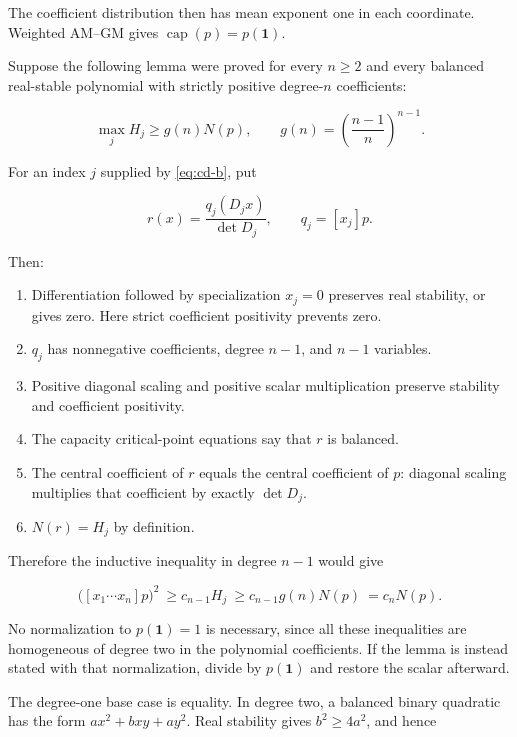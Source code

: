 \documentclass[11pt,a4paper]{article}
\providecommand{\tightlist}{\setlength{\itemsep}{0pt}\setlength{\parskip}{0pt}}
\theoremstyle{definition}
\theoremstyle{remark}
\begin{document}
The coefficient distribution then has mean exponent one in each
coordinate. Weighted AM--GM gives \(\operatorname{cap}(p)=p(\mathbf1)\).

Suppose the following lemma were proved for every \(n\ge2\) and every
balanced real-stable polynomial with strictly positive degree-\(n\)
coefficients:

\begin{equation}\label{eq:cd-b}
\max_j H_j\ge g(n)N(p),\qquad
g(n)=\left(\frac{n-1}{n}\right)^{n-1}.
\end{equation}

For an index \(j\) supplied by \eqref{eq:cd-b}, put

\[
r(x)=\frac{q_j(D_jx)}{\det D_j},\qquad q_j=[x_j]p.
\]

Then:

\begin{enumerate}
\def\labelenumi{\arabic{enumi}.}
\tightlist
\item
  Differentiation followed by specialization \(x_j=0\) preserves real
  stability, or gives zero. Here strict coefficient positivity prevents
  zero.
\item
  \(q_j\) has nonnegative coefficients, degree \(n-1\), and \(n-1\)
  variables.
\item
  Positive diagonal scaling and positive scalar multiplication preserve
  stability and coefficient positivity.
\item
  The capacity critical-point equations say that \(r\) is balanced.
\item
  The central coefficient of \(r\) equals the central coefficient of
  \(p\): diagonal scaling multiplies that coefficient by exactly
  \(\det D_j\).
\item
  \(N(r)=H_j\) by definition.
\end{enumerate}

Therefore the inductive inequality in degree \(n-1\) would give

\[
\bigl([x_1\cdots x_n]p\bigr)^2
\ \ge c_{n-1}H_j
\ \ge c_{n-1}g(n)N(p)
\ =c_nN(p).
\]

No normalization to \(p(\mathbf1)=1\) is necessary, since all these
inequalities are homogeneous of degree two in the polynomial
coefficients. If the lemma is instead stated with that normalization,
divide by \(p(\mathbf1)\) and restore the scalar afterward.

The degree-one base case is equality. In degree two, a balanced binary
quadratic has the form \(a x^2+bxy+a y^2\). Real stability gives
\(b^2\ge4a^2\), and hence
\end{document}
